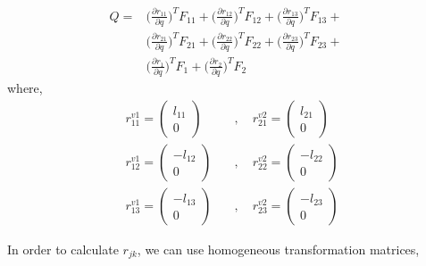 \documentclass[12pt]{article}
\begin{document}
\begin{equation}
    \begin{split}
        Q = & \Big( \frac{\partial r_{11}}{\partial q} \Big)^T F_{11} + \Big( \frac{\partial r_{12}}{\partial q} \Big)^T F_{12} + \Big( \frac{\partial r_{13}}{\partial q} \Big)^T F_{13} + \quad \\ & \Big( \frac{\partial r_{21}}{\partial q} \Big)^T F_{21} + \Big( \frac{\partial r_{22}}{\partial q} \Big)^T F_{22} + \Big( \frac{\partial r_{23}}{\partial q} \Big)^T F_{23} + \quad \\
        & \Big( \frac{\partial r_{1}}{\partial q} \Big)^T F_{1} + \Big( \frac{\partial r_{2}}{\partial q} \Big)^T F_{2} 
    \end{split}
\end{equation}
where,
\begin{equation}\label{tyre_vector_position_fixed_frame}
    \begin{split}
        r_{11}^{v1} = \begin{pmatrix} l_{11} \\ 0 \end{pmatrix} \quad &, \quad r_{21}^{v2} = \begin{pmatrix} l_{21} \\ 0 \end{pmatrix} \\
        r_{12}^{v1} = \begin{pmatrix} - l_{12} \\ 0 \end{pmatrix} \quad &, \quad r_{22}^{v2} = \begin{pmatrix} - l_{22} \\ 0 \end{pmatrix} \\
        r_{13}^{v1} = \begin{pmatrix} - l_{13} \\ 0 \end{pmatrix} \quad &, \quad r_{23}^{v2} = \begin{pmatrix} -l_{23} \\ 0 \end{pmatrix}
    \end{split}
\end{equation}

In order to calculate $r_{jk}$, we can use homogeneous transformation matrices,
\end{document}
